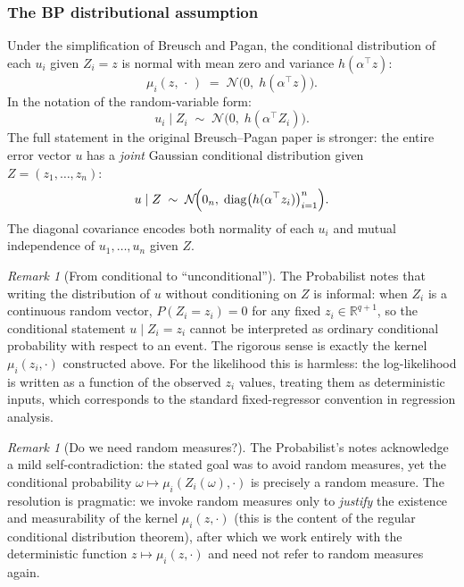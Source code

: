 \documentclass[a4paper,oneside,12pt]{extarticle}
\theoremstyle{plain}
\theoremstyle{definition}
\theoremstyle{remark}
\newtheorem{remark}[proposition]{Remark}
\begin{document}
\subsubsection*{The BP distributional assumption}

Under the simplification of Breusch and Pagan, the conditional
distribution of each $u_i$ given $Z_i = z$ is normal with mean
zero and variance $h(\alpha^\top z)$:
\[
  \mu_i(z,\,\cdot\,) \;=\; \mathcal{N}\!\bigl(0,\; h(\alpha^\top z)\bigr).
\]
In the notation of the random-variable form:
\[
  u_i \mid Z_i \;\sim\; \mathcal{N}\!\bigl(0,\; h(\alpha^\top Z_i)\bigr).
\]
The full statement in the original Breusch--Pagan paper is stronger:
the entire error vector $u$ has a \emph{joint} Gaussian conditional
distribution given $Z = (z_1,\ldots,z_n)$:
\[
  u \mid Z \;\sim\;
  \mathcal{N}\!\Bigl(0_n,\;\operatorname{diag}\bigl(h(\alpha^\top z_i)\bigr)_{i=1}^n\Bigr).
\]
The diagonal covariance encodes both normality of each $u_i$ and
mutual independence of $u_1,\ldots,u_n$ given $Z$.

\begin{remark}[From conditional to ``unconditional'']
The Probabilist notes that writing the distribution of $u$ without conditioning
on $Z$ is informal: when $Z_i$ is a continuous random vector,
$P(Z_i = z_i) = 0$ for any fixed $z_i \in \mathbb{R}^{q+1}$, so
the conditional statement $u \mid Z_i = z_i$ cannot be interpreted
as ordinary conditional probability with respect to an event.  The
rigorous sense is exactly the kernel $\mu_i(z_i, \cdot)$ constructed
above.  For the likelihood this is harmless: the log-likelihood is
written as a function of the observed $z_i$ values, treating them as
deterministic inputs, which corresponds to the standard fixed-regressor
convention in regression analysis.
\end{remark}

\begin{remark}[Do we need random measures?]
The Probabilist's notes acknowledge a mild self-contradiction: the stated goal
was to avoid random measures, yet the conditional probability
$\omega \mapsto \mu_i(Z_i(\omega), \cdot)$ is precisely a
random measure.  The resolution is pragmatic: we invoke random
measures only to \emph{justify} the existence and measurability of
the kernel $\mu_i(z,\cdot)$ (this is the content of the regular
conditional distribution theorem), after which we work entirely with
the deterministic function $z \mapsto \mu_i(z, \cdot)$ and need
not refer to random measures again.
\end{remark}
\end{document}
